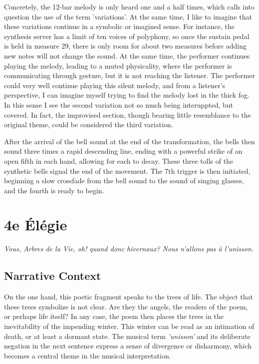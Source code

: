 \documentclass[12pt,twoside,maitrise]{dms_ks}
\theoremstyle{definition}
\begin{document}
Concretely, the 12-bar melody is only heard one and a half times, which calls into question the use of the term 'variations'. 
At the same time, I like to imagine that these variations continue in a symbolic or imagined sense. 
For instance, the synthesis server has a limit of ten voices of polyphony, so once the sustain pedal is held in measure 29, there is only room for about two measures before adding new notes will not change the sound. 
At the same time, the performer continues playing the melody, leading to a muted physicality, where the performer is communicating through gesture, but it is not reaching the listener. 
The performer could very well continue playing this silent melody, and from a listener's perspective, I can imagine myself trying to find the melody lost in the thick fog. 
In this sense I see the second variation not so much being interuppted, but covered. 
In fact, the improvised section, though bearing little resemblance to the original theme, could be considered the third variation.

After the arrival of the bell sound at the end of the transformation, the bells then sound three times a rapid descending line, ending with a powerful strike of an open fifth in each hand, allowing for each to decay. 
These three tolls of the synthetic bells signal the end of the movement. 
The 7th trigger is then initiated, beginning a slow crossfade from the bell sound to the sound of singing glasses, and the fourth is ready to begin.


\section{4e Élégie}

\epigraph{\textit{Vous, Arbres de la Vie, oh! quand donc hivernaux? Nous n'allons pas à l'unisson.}}{}

\subsection{Narrative Context}

On the one hand, this poetic fragment speaks to the trees of life.
The object that these trees symbolize is not clear.
Are they the angels, the readers of the poem, or perhaps life itself?
In any case, the poem then places the trees in the inevitability of the impending winter.
This winter can be read as an intimation of death, or at least a dormant state.
The musical term \textit{'unisson'} and its deliberate negation in the next sentence express a sense of divergence or disharmony, which becomes a central theme in the musical interpretation.
\end{document}
